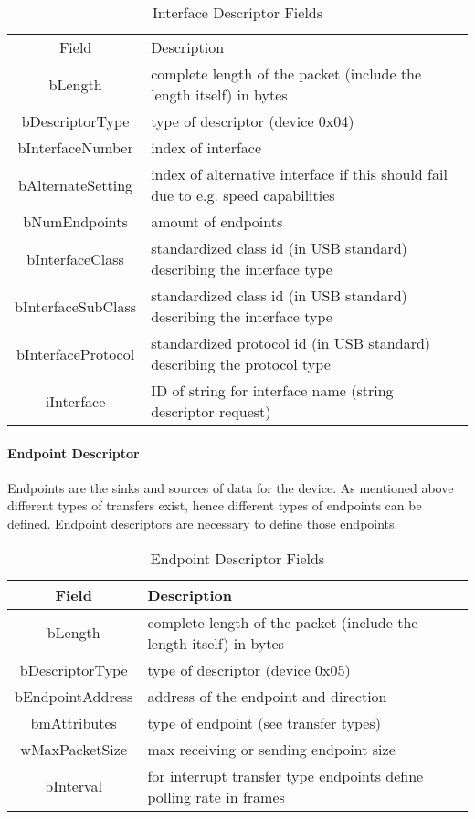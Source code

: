 \begin{table}
\begin{tabular}{c|p{10 cm}}
Field & Description \\
bLength &  complete length of the packet (include the length itself) in bytes \\
bDescriptorType &  type of descriptor (device 0x04) \\
bInterfaceNumber & index of interface \\
bAlternateSetting & index of alternative interface if this should fail due to e.g. speed capabilities \\
bNumEndpoints & amount of endpoints \\
bInterfaceClass & standardized class id (in USB standard) describing the interface type \\
bInterfaceSubClass & standardized class id (in USB standard) describing the interface type \\
bInterfaceProtocol & standardized protocol id (in USB standard) describing the protocol type \\
iInterface & ID of string for interface name (string descriptor request) \\
\end{tabular}
 \caption{Interface Descriptor Fields}
\end{table}

\paragraph{Endpoint Descriptor} 

Endpoints are the sinks and sources of data for the device. As mentioned above different types of transfers exist, hence different types of 
endpoints can be defined. Endpoint descriptors are necessary to define those endpoints.%

\begin{table}
\begin{tabular}{c|p{10 cm}}
Field & Description \\ \hline
bLength & complete length of the packet (include the length itself) in bytes \\
bDescriptorType & type of descriptor (device 0x05) \\
bEndpointAddress & address of the endpoint and direction\\
bmAttributes & type of endpoint (see transfer types)\\
wMaxPacketSize & max receiving or sending endpoint size\\
bInterval & for interrupt transfer type endpoints define polling rate in frames\\
\end{tabular}
 \caption{Endpoint Descriptor Fields}
\end{table}

